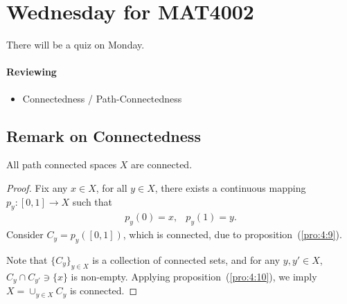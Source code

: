 \section{Wednesday for MAT4002}
There will be a quiz on Monday.
\paragraph{Reviewing}
\begin{itemize}
\item
Connectedness / Path-Connectedness
\end{itemize}
\subsection{Remark on Connectedness}
\begin{proposition}\label{pro:4:14}
All path connected spaces $X$ are connected.
\end{proposition}
\begin{proof}
Fix any $x\in X$, for all $y\in X$, there exists a continuous mapping $p_y:[0,1]\to X$ such that 
\[
\begin{array}{ll}
p_y(0)=x,&p_y(1)=y.
\end{array}
\]
Consider $C_y=p_y([0,1])$, which is connected, due to proposition~(\ref{pro:4:9}).

Note that $\{C_y\}_{y\in X}$ is a collection of connected sets, and for any $y,y'\in X$, $C_y\cap C_{y'}\ni\{x\}$ is non-empty.
Applying proposition~(\ref{pro:4:10}), we imply $X=\cup_{y\in X}C_y$ is connected.
\end{proof}



